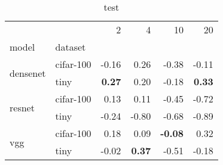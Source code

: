\begin{table}
\caption{test}
\begin{tabular}{llrrrr}
\toprule
 &  & 2 & 4 & 10 & 20 \\
model & dataset &  &  &  &  \\
\midrule
\multirow[c]{2}{*}{densenet} & cifar-100 & -0.16 & 0.26 & -0.38 & -0.11 \\
 & tiny & \bfseries 0.27 & 0.20 & -0.18 & \bfseries 0.33 \\
\multirow[c]{2}{*}{resnet} & cifar-100 & 0.13 & 0.11 & -0.45 & -0.72 \\
 & tiny & -0.24 & -0.80 & -0.68 & -0.89 \\
\multirow[c]{2}{*}{vgg} & cifar-100 & 0.18 & 0.09 & \bfseries -0.08 & 0.32 \\
 & tiny & -0.02 & \bfseries 0.37 & -0.51 & -0.18 \\
\bottomrule
\end{tabular}
\end{table}
